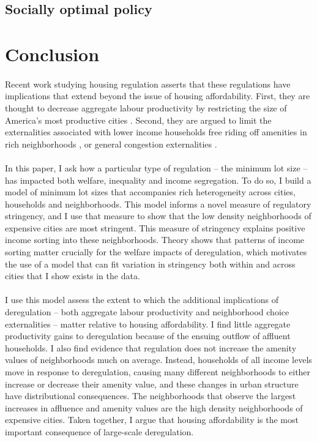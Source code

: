 \documentclass[12pt]{article}
\begin{document}
 
 \subsection{Socially optimal policy}


\section{Conclusion}
\paragraph*{}
	Recent work studying housing regulation asserts that these regulations have implications that extend beyond the issue of housing affordability. First, they are thought to decrease aggregate labour productivity by restricting the size of America's most productive cities \citep{glaesergyourko2018, hseihmoretti, durantonpugaurbgrowth, parkho}. Second, they are argued to limit the externalities associated with lower income households free riding off amenities in rich neighborhoods \citep{hamilton1976, ineffTiebout, brueckner2021}, or general congestion externalities \citep{parkho, glaesergyourko2018}. 
\paragraph*{}
	In this paper, I ask how a particular type of regulation -- the minimum lot size -- has impacted both welfare, inequality and income segregation. To do so, I build a model of minimum lot sizes that accompanies rich heterogeneity across cities, households and neighborhoods. This model informs a novel measure of regulatory stringency, and I use that measure to show that the low density neighborhoods of expensive cities are most stringent. This measure of stringency explains positive income sorting into these neighborhoods. Theory shows that patterns of income sorting matter crucially for the welfare impacts of deregulation, which motivates the use of a model that can fit variation in stringency both within and across cities that I show exists in the data.
	
	\paragraph*{}
	I use this model assess the extent to which the additional implications of deregulation -- both aggregate labour productivity and neighborhood choice externalities -- matter relative to housing affordability. I find little aggregate productivity gains to deregulation because of the ensuing outflow of affluent households. I also find evidence that regulation does not increase the amenity values of neighborhoods much on average. Instead, households of all income levels move in response to deregulation, causing many different neighborhoods to either increase or decrease their amenity value, and these changes in urban structure have distributional consequences. The neighborhoods that observe the largest increases in affluence and amenity values are the high density neighborhoods of expensive cities. Taken together, I argue that housing affordability is the most important consequence of large-scale deregulation. 
	
\end{document}
